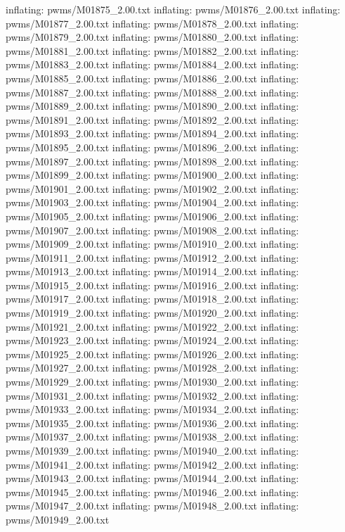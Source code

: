 \documentclass[letterpaper,10pt,english]{sphinxmanual}
\begin{document}
{\begin{sphinxVerbatim}[commandchars=\\\{\}]
  inflating: pwms/M01875\_2.00.txt
  inflating: pwms/M01876\_2.00.txt
  inflating: pwms/M01877\_2.00.txt
  inflating: pwms/M01878\_2.00.txt
  inflating: pwms/M01879\_2.00.txt
  inflating: pwms/M01880\_2.00.txt
  inflating: pwms/M01881\_2.00.txt
  inflating: pwms/M01882\_2.00.txt
  inflating: pwms/M01883\_2.00.txt
  inflating: pwms/M01884\_2.00.txt
  inflating: pwms/M01885\_2.00.txt
  inflating: pwms/M01886\_2.00.txt
  inflating: pwms/M01887\_2.00.txt
  inflating: pwms/M01888\_2.00.txt
  inflating: pwms/M01889\_2.00.txt
  inflating: pwms/M01890\_2.00.txt
  inflating: pwms/M01891\_2.00.txt
  inflating: pwms/M01892\_2.00.txt
  inflating: pwms/M01893\_2.00.txt
  inflating: pwms/M01894\_2.00.txt
  inflating: pwms/M01895\_2.00.txt
  inflating: pwms/M01896\_2.00.txt
  inflating: pwms/M01897\_2.00.txt
  inflating: pwms/M01898\_2.00.txt
  inflating: pwms/M01899\_2.00.txt
  inflating: pwms/M01900\_2.00.txt
  inflating: pwms/M01901\_2.00.txt
  inflating: pwms/M01902\_2.00.txt
  inflating: pwms/M01903\_2.00.txt
  inflating: pwms/M01904\_2.00.txt
  inflating: pwms/M01905\_2.00.txt
  inflating: pwms/M01906\_2.00.txt
  inflating: pwms/M01907\_2.00.txt
  inflating: pwms/M01908\_2.00.txt
  inflating: pwms/M01909\_2.00.txt
  inflating: pwms/M01910\_2.00.txt
  inflating: pwms/M01911\_2.00.txt
  inflating: pwms/M01912\_2.00.txt
  inflating: pwms/M01913\_2.00.txt
  inflating: pwms/M01914\_2.00.txt
  inflating: pwms/M01915\_2.00.txt
  inflating: pwms/M01916\_2.00.txt
  inflating: pwms/M01917\_2.00.txt
  inflating: pwms/M01918\_2.00.txt
  inflating: pwms/M01919\_2.00.txt
  inflating: pwms/M01920\_2.00.txt
  inflating: pwms/M01921\_2.00.txt
  inflating: pwms/M01922\_2.00.txt
  inflating: pwms/M01923\_2.00.txt
  inflating: pwms/M01924\_2.00.txt
  inflating: pwms/M01925\_2.00.txt
  inflating: pwms/M01926\_2.00.txt
  inflating: pwms/M01927\_2.00.txt
  inflating: pwms/M01928\_2.00.txt
  inflating: pwms/M01929\_2.00.txt
  inflating: pwms/M01930\_2.00.txt
  inflating: pwms/M01931\_2.00.txt
  inflating: pwms/M01932\_2.00.txt
  inflating: pwms/M01933\_2.00.txt
  inflating: pwms/M01934\_2.00.txt
  inflating: pwms/M01935\_2.00.txt
  inflating: pwms/M01936\_2.00.txt
  inflating: pwms/M01937\_2.00.txt
  inflating: pwms/M01938\_2.00.txt
  inflating: pwms/M01939\_2.00.txt
  inflating: pwms/M01940\_2.00.txt
  inflating: pwms/M01941\_2.00.txt
  inflating: pwms/M01942\_2.00.txt
  inflating: pwms/M01943\_2.00.txt
  inflating: pwms/M01944\_2.00.txt
  inflating: pwms/M01945\_2.00.txt
  inflating: pwms/M01946\_2.00.txt
  inflating: pwms/M01947\_2.00.txt
  inflating: pwms/M01948\_2.00.txt
  inflating: pwms/M01949\_2.00.txt

\end{sphinxVerbatim}}
\end{document}
